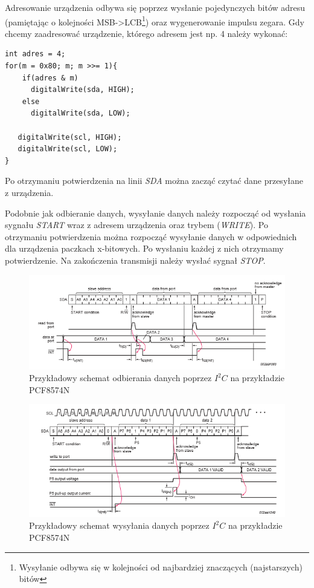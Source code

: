 \documentclass{xmgr}
\begin{document}
Adresowanie urządzenia odbywa się poprzez wysłanie pojedynczych bitów adresu (pamiętając o kolejności MSB->LCB\footnote{Wysyłanie odbywa się w kolejności od najbardziej znaczących (najstarszych) bitów}) oraz wygenerowanie impulsu zegara. Gdy chcemy zaadresować urządzenie, którego adresem jest np. 4 należy wykonać:
\begin{lstlisting}[label=bot-dirs-alg,caption=Adresowanie urządzenia $I^2C$ na przykładzie PCF8574N]
int adres = 4;
for(m = 0x80; m; m >>= 1){
    if(adres & m)         
      digitalWrite(sda, HIGH);
    else
      digitalWrite(sda, LOW);
        
   digitalWrite(scl, HIGH);
   digitalWrite(scl, LOW); 
}
\end{lstlisting}
Po otrzymaniu potwierdzenia na linii \emph{SDA} można zacząć czytać dane przesyłane z urządzenia.


Podobnie jak odbieranie danych, wysyłanie danych należy rozpocząć od wysłania sygnału \emph{START} wraz z adresem urządzenia oraz trybem (\emph{WRITE}). Po otrzymaniu potwierdzenia można rozpocząć wysyłanie danych w odpowiednich dla urządzenia paczkach x-bitowych. Po wysłaniu każdej z nich otrzymamy potwierdzenie. Na zakończenia transmisji należy wysłać sygnał \emph{STOP}.

\begin{figure}[!h]
    \centering
    \includegraphics[height=0.25\textheight]{images/read_i2c.png}
    \caption{Przykładowy schemat odbierania danych poprzez $I^2C$ na przykładzie PCF8574N\label{$I^2C$}}
\end{figure}

\begin{figure}[!h]
    \centering
    \includegraphics[height=0.2\textheight]{images/write_i2c.png}
    \caption{Przykładowy schemat wysyłania danych poprzez $I^2C$ na przykładzie PCF8574N\label{$I^2C$}}
\end{figure}
\end{document}
